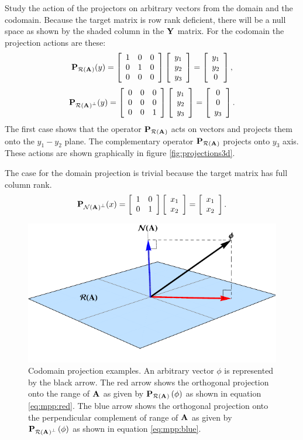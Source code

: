 Study the action of the projectors on arbitrary vectors from the domain and the codomain. Because the target matrix is row rank deficient, there will be a null space as shown by the shaded column in the $\Y{}$ matrix. For the codomain the projection actions are these:
\begin{equation}
  \projra (y) = \mat{ccc}{1&0&0\\0&1&0\\0&0&0} 
     \mat{c}{y_{1}\\y_{2}\\y_{3}} = \mat{c}{y_{1}\\y_{2}\\0},
     \label{eq:mpp:red}
\end{equation}
\begin{equation}
  \projrap (y) = \mat{ccc}{0&0&0\\0&0&0\\0&0&1} 
     \mat{c}{y_{1}\\y_{2}\\y_{3}} = \mat{c}{0\\0\\y_{3}}.
     \label{eq:mpp:blue}
\end{equation}
The first case shows that the operator $\projra$ acts on vectors and projects them onto the $y_{1}-y_{2}$ plane. The complementary operator $\projra$ projects onto $y_{3}$ axis. These actions are shown graphically in figure \eqref{fig:projections3d}.

The case for the domain projection is trivial because the target matrix has full column rank.
\begin{equation}
  \projnap (x) = \itwo \mat{c}{x_{1}\\x_{2}} = \mat{c}{x_{1}\\x_{2}}.
\end{equation}

\begin{figure}[htbp] %
   \centering
   \includegraphics[]{pdf/mpp/projections} 
   \caption{Codomain projection examples. An arbitrary vector $\phi$ is represented by the black arrow. The red arrow shows the orthogonal projection onto the range of $\A{}$ as given by $\projra\paren{\phi}$ as shown in equation \eqref{eq:mpp:red}. The blue arrow shows the orthogonal projection onto the perpendicular complement of range of $\A{}$ as given by $\projrap\paren{\phi}$ as shown in equation \eqref{eq:mpp:blue}.}
   \label{fig:projections3d}
\end{figure}

